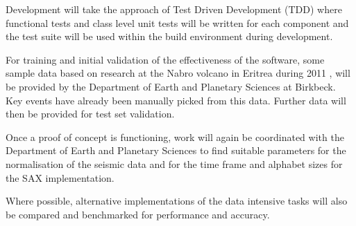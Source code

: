 \documentclass[11pt]{scrartcl}
\begin{document}
	Development will take the approach of Test Driven Development (TDD) where functional tests and class level unit tests will be written for each component and the test suite will be used within the build environment during development.
	
	For training and initial validation of the effectiveness of the software, some sample data based on research at the Nabro volcano in Eritrea during 2011 \citep{eritrea1}, \citep{eritrea2} will be provided by the Department of Earth and Planetary Sciences at Birkbeck.  Key events have already been manually picked from this data.  Further data will then be provided for test set validation.
	
	Once a proof of concept is functioning, work will again be coordinated with the Department of Earth and Planetary Sciences to find suitable parameters for the normalisation of the seismic data and for the time frame and alphabet sizes for the SAX implementation.
	
	Where possible, alternative implementations of the data intensive tasks will also be compared and benchmarked for performance and accuracy.



\end{document}
